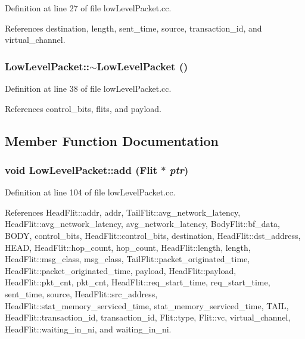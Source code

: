 Definition at line 27 of file lowLevelPacket.cc.

References destination, length, sent\_\-time, source, transaction\_\-id, and virtual\_\-channel.
\subsubsection[{$\sim$LowLevelPacket}]{\setlength{\rightskip}{0pt plus 5cm}LowLevelPacket::$\sim$LowLevelPacket ()}\label{classLowLevelPacket_52d6041c394872c42cd4211e09ca76d4}




Definition at line 38 of file lowLevelPacket.cc.

References control\_\-bits, flits, and payload.

\subsection{Member Function Documentation}
\subsubsection[{add}]{\setlength{\rightskip}{0pt plus 5cm}void LowLevelPacket::add ({\bf Flit} $\ast$ {\em ptr})}\label{classLowLevelPacket_b2d005a02fb4645db9145f699d330656}




Definition at line 104 of file lowLevelPacket.cc.

References HeadFlit::addr, addr, TailFlit::avg\_\-network\_\-latency, HeadFlit::avg\_\-network\_\-latency, avg\_\-network\_\-latency, BodyFlit::bf\_\-data, BODY, control\_\-bits, HeadFlit::control\_\-bits, destination, HeadFlit::dst\_\-address, HEAD, HeadFlit::hop\_\-count, hop\_\-count, HeadFlit::length, length, HeadFlit::msg\_\-class, msg\_\-class, TailFlit::packet\_\-originated\_\-time, HeadFlit::packet\_\-originated\_\-time, payload, HeadFlit::payload, HeadFlit::pkt\_\-cnt, pkt\_\-cnt, HeadFlit::req\_\-start\_\-time, req\_\-start\_\-time, sent\_\-time, source, HeadFlit::src\_\-address, HeadFlit::stat\_\-memory\_\-serviced\_\-time, stat\_\-memory\_\-serviced\_\-time, TAIL, HeadFlit::transaction\_\-id, transaction\_\-id, Flit::type, Flit::vc, virtual\_\-channel, HeadFlit::waiting\_\-in\_\-ni, and waiting\_\-in\_\-ni.

